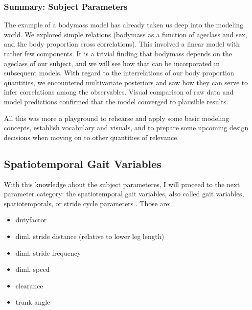 \subsubsection{Summary: Subject Parameters}
\label{sec:orge0c65f9}
The example of a bodymass model has already taken us deep into the modeling world.
We explored simple relations (bodymass as a function of ageclass and sex, and the body proportion cross correlations).
This involved a linear model with rather few components.
It is a trivial finding that bodymass depends on the ageclass of our subject, and we will see how that can be incorporated in subsequent models.
With regard to the interrelations of our body proportion quantities, we encountered multivariate posteriors and saw how they can serve to infer correlations among the observables.
Visual comparison of raw data and model predictions confirmed that the model converged to plausible results.

All this was more a playground to rehearse and apply some basic modeling concepts, establish vocabulary and visuals, and to prepare some upcoming design decisions when moving on to other quantities of relevance.

\FloatBarrier\clearpage
\subsection{Spatiotemporal Gait Variables}
\label{sec:org69bec74}
With this knowledge about the subject parameteres, I will proceed to the next parameter category: the spatiotemporal gait variables, also called gait variables, spatiotemporals, or stride cycle parameters . Those are:
\begin{itemize}
\item dutyfactor
\item diml. stride distance (relative to lower leg length)
\item diml. stride frequency
\item diml. speed
\item clearance
\item trunk angle
\end{itemize}


